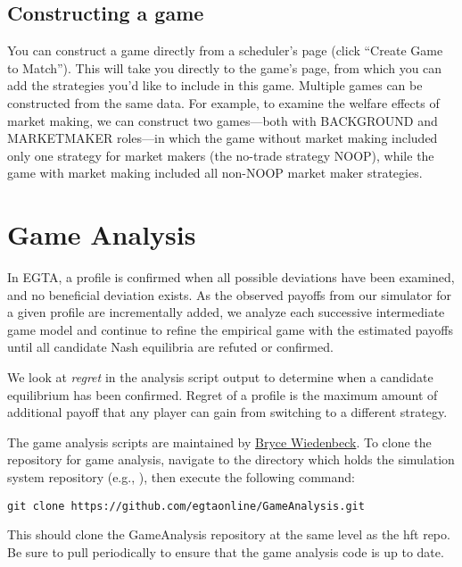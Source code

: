 \documentclass[11pt]{article}
\begin{document}
\subsection{Constructing a game}

You can construct a game directly from a scheduler's page (click ``Create Game to Match''). This will take you directly to the game's page, from which you can add the strategies you'd like to include in this game.
Multiple games can be constructed from the same data.
For example, to examine the welfare effects of market making, we can construct two games---both with BACKGROUND and MARKETMAKER roles---in which the game without market making included only one strategy for market makers (the no-trade strategy NOOP), while the game with market making included all non-NOOP market maker strategies.


\section{Game Analysis}\label{sec:analysis}

In EGTA, a profile is confirmed when all possible deviations have been examined, and no beneficial deviation exists.
As the observed payoffs from our simulator for a given profile are incrementally added, we analyze each successive intermediate game model and continue to refine the empirical game with the estimated payoffs until all candidate Nash equilibria are refuted or confirmed.

We look at \emph{regret} in the analysis script output to determine when a candidate equilibrium has been confirmed. Regret of a profile is the maximum amount of additional payoff that any player can gain from switching to a different strategy.

The game analysis scripts are maintained by \href{mailto:btwied@umich.edu}{Bryce Wiedenbeck}. To clone the repository for game analysis, navigate to the directory which holds the simulation system repository (e.g., ), then execute the following command:
\begin{verbatim}
git clone https://github.com/egtaonline/GameAnalysis.git
\end{verbatim}
This should clone the GameAnalysis repository at the same level as the hft repo.
Be sure to pull periodically to ensure that the game analysis code is up to date.
\end{document}
